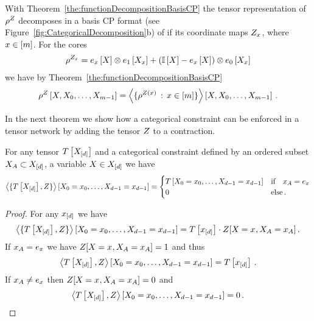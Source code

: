 With Theorem~\ref{the:functionDecompositionBasisCP} the tensor representation of $\rho^{Z}$ decomposes in a basis CP format (see Figure~\ref{fig:CategoricalDecomposition}b) of if its coordinate maps $Z_{x}$, where $x\in[m]$.
For the cores
\begin{align}
	\rho^{Z_{x}} = e_{x}\left[X\right] \otimes e_{1}\left[X_{x}\right] + (\mathbb{I}\left[X\right]- e_{x}\left[X\right] ) \otimes e_{0}\left[X_{x}\right]
\end{align}
we have by Theorem~\ref{the:functionDecompositionBasisCP}
\begin{align*}
	\rho^{Z}\left[X, X_{0}, \ldots, X_{m-1}\right]
	= \left\langle \{\rho^{Z(x)} \, : \, x\in[m]\}\right\rangle \left[ X, X_{0}, \ldots, X_{m-1} \right] \, .
\end{align*}


In the next theorem we show how a categorical constraint can be enforced in a tensor network by adding the tensor $Z$ to a contraction.

\begin{theorem}
	For any tensor $T\left[X_{[d]}\right]$ and a categorical constraint defined by an ordered subset $X_{A}\subset X_{[d]}$, a variable $X\in X_{[d]}$ we have
	\begin{align*}
	 	\left\langle \{T\left[X_{[d]}\right], Z\}\right\rangle \left[ X_{0}=x_{0},\ldots,X_{d-1}=x_{d-1} \right]
		= \begin{cases}
			T\left[X_{0}=x_{0},\ldots,X_{d-1}=x_{d-1}\right] & \text{if} \quad x_{A} = e_{x} \\
			0 & \text{else} \, .
		\end{cases}
	\end{align*}
\end{theorem}
\begin{proof}
	For any $x_{[d]}$ we have
		\[ \left\langle \{T\left[X_{[d]}\right], Z\}\right\rangle \left[ X_{0}=x_{0},\ldots,X_{d-1}=x_{d-1} \right]  =
			T\left[x_{[d]}\right] \cdot Z[X_{}=x_{},X_{A}=x_{A}] \, .
		\]
	If $x_{A} = e_{x}$ we have $Z[X_{}=x_{},X_{A}=x_{A}] = 1$ and thus
		\[ \left\langle T\left[X_{[d]}\right],Z\right\rangle \left[ X_{0}=x_{0},\ldots,X_{d-1}=x_{d-1} \right]  =  T\left[x_{[d]}\right]  \, . \]
	If $x_{A} \neq e_{x}$ then $Z[X_{}=x_{},X_{A}=x_{A}] = 0$ and
		\[ \left\langle T\left[X_{[d]}\right],Z\right\rangle \left[ X_{0}=x_{0},\ldots,X_{d-1}=x_{d-1} \right]  = 0 \, . \]
\end{proof}

